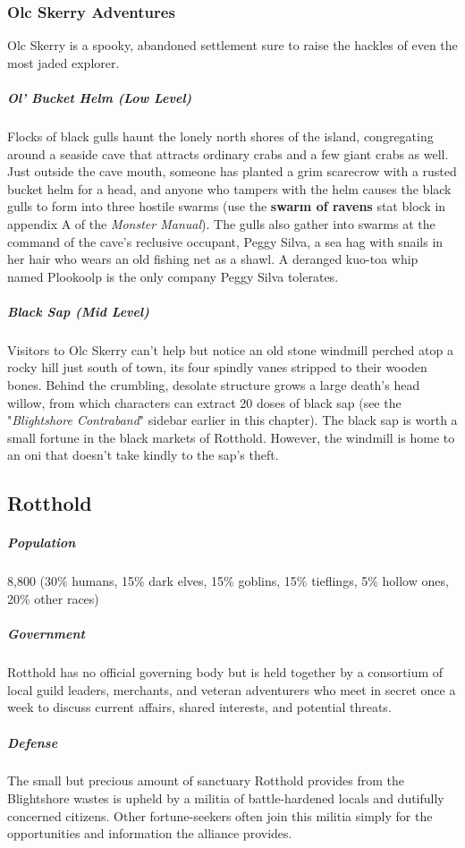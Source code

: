 \documentclass[10pt,a4paper,twoside,bg=print,twocolumn,openany,nodeprecatedcode]{dndbook}
\begin{document}
\subsubsection{Olc Skerry Adventures}
Olc Skerry is a spooky, abandoned settlement sure to raise the hackles of even the most jaded explorer.

\subparagraph{Ol' Bucket Helm (Low Level)}
Flocks of black gulls haunt the lonely north shores of the island, congregating around a seaside cave that attracts ordinary crabs and a few giant crabs as well. Just outside the cave mouth, someone has planted a grim scarecrow with a rusted bucket helm for a head, and anyone who tampers with the helm causes the black gulls to form into three hostile swarms (use the \textbf{swarm of ravens} stat block in appendix A of the \textit{Monster Manual}). The gulls also gather into swarms at the command of the cave's reclusive occupant, Peggy Silva, a sea hag with snails in her hair who wears an old fishing net as a shawl. A deranged kuo-toa whip named Plookoolp is the only company Peggy Silva tolerates.

\subparagraph{Black Sap (Mid Level)}
Visitors to Olc Skerry can't help but notice an old stone windmill perched atop a rocky hill just south of town, its four spindly vanes stripped to their wooden bones. Behind the crumbling, desolate structure grows a large death's head willow, from which characters can extract 20 doses of black sap (see the "\textit{Blightshore Contraband}" sidebar earlier in this chapter). The black sap is worth a small fortune in the black markets of Rotthold. However, the windmill is home to an oni that doesn't take kindly to the sap's theft.

\subsection{Rotthold}
\subparagraph{Population}
8,800 (30\% humans, 15\% dark elves, 15\% goblins, 15\% tieflings, 5\% hollow ones, 20\% other races)

\subparagraph{Government}
Rotthold has no official governing body but is held together by a consortium of local guild leaders, merchants, and veteran adventurers who meet in secret once a week to discuss current affairs, shared interests, and potential threats.

\subparagraph{Defense}
The small but precious amount of sanctuary Rotthold provides from the Blightshore wastes is upheld by a militia of battle-hardened locals and dutifully concerned citizens. Other fortune-seekers often join this militia simply for the opportunities and information the alliance provides.
\end{document}
